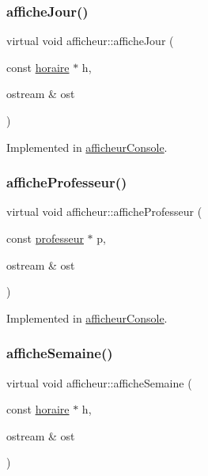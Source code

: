 \subsubsection{\texorpdfstring{affiche\+Jour()}{afficheJour()}}
{\footnotesize\ttfamily virtual void afficheur\+::affiche\+Jour (\begin{DoxyParamCaption}\item[{const \hyperlink{classhoraire}{horaire} $\ast$}]{h,  }\item[{ostream \&}]{ost }\end{DoxyParamCaption})\hspace{0.3cm}{\ttfamily [pure virtual]}}



Implemented in \hyperlink{classafficheur_console_a9d69206c3cd6409d1437ee546e71cf25}{afficheur\+Console}.

\hypertarget{classafficheur_a54b3e457d56738ed20641e5546872142}{}\label{classafficheur_a54b3e457d56738ed20641e5546872142} 
\subsubsection{\texorpdfstring{affiche\+Professeur()}{afficheProfesseur()}}
{\footnotesize\ttfamily virtual void afficheur\+::affiche\+Professeur (\begin{DoxyParamCaption}\item[{const \hyperlink{classprofesseur}{professeur} $\ast$}]{p,  }\item[{ostream \&}]{ost }\end{DoxyParamCaption})\hspace{0.3cm}{\ttfamily [pure virtual]}}



Implemented in \hyperlink{classafficheur_console_aa178d74ab314df687800c612a3615ed6}{afficheur\+Console}.

\hypertarget{classafficheur_a1551534b5916a48d3ea73f0d68929e95}{}\label{classafficheur_a1551534b5916a48d3ea73f0d68929e95} 
\subsubsection{\texorpdfstring{affiche\+Semaine()}{afficheSemaine()}}
{\footnotesize\ttfamily virtual void afficheur\+::affiche\+Semaine (\begin{DoxyParamCaption}\item[{const \hyperlink{classhoraire}{horaire} $\ast$}]{h,  }\item[{ostream \&}]{ost }\end{DoxyParamCaption})\hspace{0.3cm}{\ttfamily [pure virtual]}}



